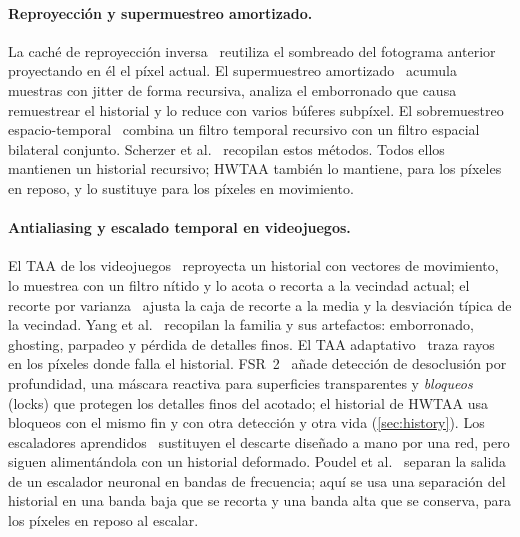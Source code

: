 \documentclass[11pt,a4paper]{article}
\begin{document}
\paragraph{Reproyección y supermuestreo amortizado.} La caché de reproyección inversa~\cite{nehab2007reprojection} reutiliza el sombreado del fotograma anterior proyectando en él el píxel actual. El supermuestreo amortizado~\cite{yang2009amortized} acumula muestras con jitter de forma recursiva, analiza el emborronado que causa remuestrear el historial y lo reduce con varios búferes subpíxel. El sobremuestreo espacio-temporal~\cite{herzog2010upsampling} combina un filtro temporal recursivo con un filtro espacial bilateral conjunto. Scherzer et al.~\cite{scherzer2012coherence} recopilan estos métodos. Todos ellos mantienen un historial recursivo; HWTAA también lo mantiene, para los píxeles en reposo, y lo sustituye para los píxeles en movimiento.

\paragraph{Antialiasing y escalado temporal en videojuegos.} El TAA de los videojuegos~\cite{karis2014taa,jimenez2016filmic} reproyecta un historial con vectores de movimiento, lo muestrea con un filtro nítido y lo acota o recorta a la vecindad actual; el recorte por varianza~\cite{salvi2016taa} ajusta la caja de recorte a la media y la desviación típica de la vecindad. Yang et al.~\cite{yang2020survey} recopilan la familia y sus artefactos: emborronado, ghosting, parpadeo y pérdida de detalles finos. El TAA adaptativo~\cite{marrs2018ataa} traza rayos en los píxeles donde falla el historial. FSR~2~\cite{amd2023fsr2} añade detección de desoclusión por profundidad, una máscara reactiva para superficies transparentes y \emph{bloqueos} (locks) que protegen los detalles finos del acotado; el historial de HWTAA usa bloqueos con el mismo fin y con otra detección y otra vida (\cref{sec:history}). Los escaladores aprendidos~\cite{liu2020dlss,xiao2020neural} sustituyen el descarte diseñado a mano por una red, pero siguen alimentándola con un historial deformado. Poudel et al.~\cite{poudel2026wavelet} separan la salida de un escalador neuronal en bandas de frecuencia; aquí se usa una separación del historial en una banda baja que se recorta y una banda alta que se conserva, para los píxeles en reposo al escalar.
\end{document}
